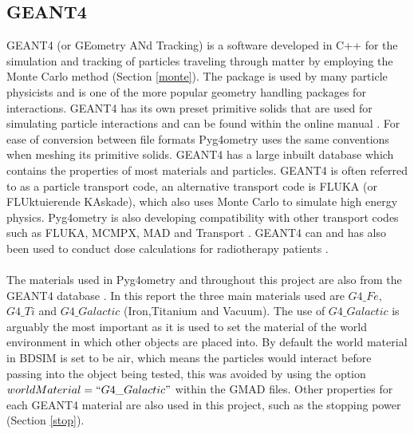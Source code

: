 \documentclass[12pt,a4paper]{article}
\begin{document}
\subsection{GEANT4}\label{GEANT4}
\label{g4}
GEANT4 (or GEometry ANd Tracking) is a software developed in C++ for the simulation and tracking of particles traveling through matter by employing the Monte Carlo method (Section \ref{monte}). The package is used by many particle physicists and is one of the more popular geometry handling packages for interactions. GEANT4 has its own preset primitive solids that are used for simulating particle interactions and can be found within the online manual \cite{solids}. For ease of conversion between file formats Pyg4ometry uses the same conventions when meshing its primitive solids. GEANT4 has a large inbuilt database which contains the properties of most materials and particles. GEANT4 is often referred to as a particle transport code, an alternative transport code is FLUKA (or FLUktuierende KAskade), which also uses Monte Carlo to simulate high energy physics. Pyg4ometry is also developing compatibility with other transport codes such as FLUKA, MCMPX, MAD and Transport \cite{pyg4om}. GEANT4 can and has also been used to conduct dose calculations for radiotherapy patients \cite{dose}.
\\\\
The materials used in Pyg4ometry and throughout this project are also from the GEANT4 database \cite{mater}. In this report the three main materials used are $G4\_Fe$, $G4\_Ti$ and $G4\_Galactic$ (Iron,Titanium and Vacuum). The use of $G4\_Galactic$ is arguably the most important as it is used to set the material of the world environment in which other objects are placed into. By default the world material in BDSIM is set to be air, which means the particles would interact before passing into the object being tested, this was avoided by using the option $worldMaterial=``G4\_Galactic"$ within the GMAD files. Other properties for each GEANT4 material are also used in this project, such as the stopping power (Section \ref{stop}). 
\end{document}
